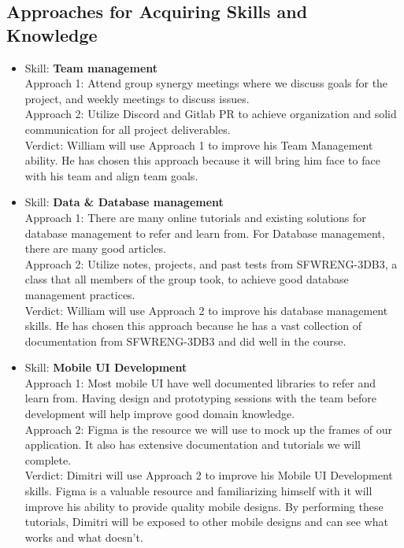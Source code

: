 \documentclass[12pt]{article}
\begin{document}
	\subsection{Approaches for Acquiring Skills and Knowledge}
	\begin{itemize}
		
		\item Skill: \textbf{Team management}
		\\ Approach 1: Attend group synergy meetings where we discuss goals for the project, and weekly meetings to discuss issues.
		\\ Approach 2: Utilize Discord and Gitlab PR to achieve organization and solid communication for all project deliverables.
		\\ Verdict: William will use Approach 1 to improve his Team Management ability. He has chosen this approach because it will bring him face to face with his team and align team goals.
		
		\item Skill: \textbf{Data \& Database management}
		\\ Approach 1: There are many online tutorials and existing solutions for database management to refer and learn from. For Database management, there are many good articles.
		\\ Approach 2: Utilize notes, projects, and past tests from SFWRENG-3DB3, a class that all members of the group took, to achieve good database management practices.
		\\ Verdict: William will use Approach 2 to improve his database management skills. He has chosen this approach because he has a vast collection of documentation from SFWRENG-3DB3 and did well in the course.

		\item Skill: \textbf{Mobile UI Development}
		\\ Approach 1: Most mobile UI have well documented libraries to refer and learn from. Having design and prototyping sessions with the team before development will help improve good domain knowledge.
		\\ Approach 2: Figma is the resource we will use to mock up the frames of our application. It also has extensive documentation and tutorials we will complete.
		\\ Verdict: Dimitri will use Approach 2 to improve his Mobile UI Development skills. Figma is a valuable resource and familiarizing himself with it will improve his ability to provide quality mobile designs. By performing these tutorials, Dimitri will be exposed to other mobile designs and can see what works and what doesn't. 


\end{itemize}
\end{document}
